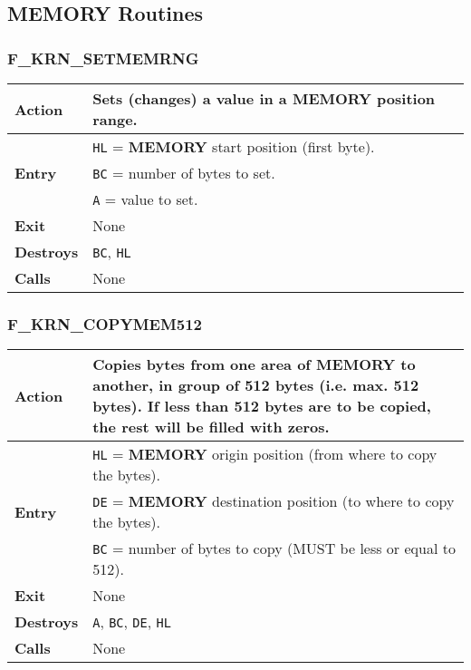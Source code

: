 \subsection{MEMORY Routines}

    \subsubsection{F\_KRN\_SETMEMRNG}
    \label{func:fkrnsetmemrng}
    \begin{tabular}{l p{15cm}}
        \hline\textbf{Action}
        & Sets (changes) a value in a \textbf{MEMORY} position range.\\
        \hline\multirow[t]{3}{4em}{\textbf{Entry}}
        & \texttt{HL} = \textbf{MEMORY} start position (first byte).\\
        & \texttt{BC} = number of bytes to set.\\
        & \texttt{A} = value to set.\\
        \hline\textbf{Exit} & None\\
        \hline\textbf{Destroys} & \texttt{BC}, \texttt{HL}\\
        \hline\textbf{Calls} & None\\
        \hline
    \end{tabular}

    \subsubsection{F\_KRN\_COPYMEM512}
    \label{func:fkrncopymem512}
    \begin{tabular}{l p{15cm}}
        \hline\textbf{Action}
        & Copies bytes from one area of \textbf{MEMORY} to another, in group
        of 512 bytes (i.e. max. 512 bytes). If less than 512 bytes are to be
        copied, the rest will be filled with zeros.\\
        \hline\multirow[t]{3}{4em}{\textbf{Entry}}
        & \texttt{HL} = \textbf{MEMORY} origin position (from where to copy
        the bytes).\\
        & \texttt{DE} = \textbf{MEMORY} destination position (to where to
        copy the bytes).\\
        & \texttt{BC} = number of bytes to copy (MUST be less or equal to
        512).\\
        \hline\textbf{Exit} & None\\
        \hline\textbf{Destroys} & \texttt{A}, \texttt{BC}, \texttt{DE},
        \texttt{HL}\\
        \hline\textbf{Calls} & None\\
        \hline
    \end{tabular}

